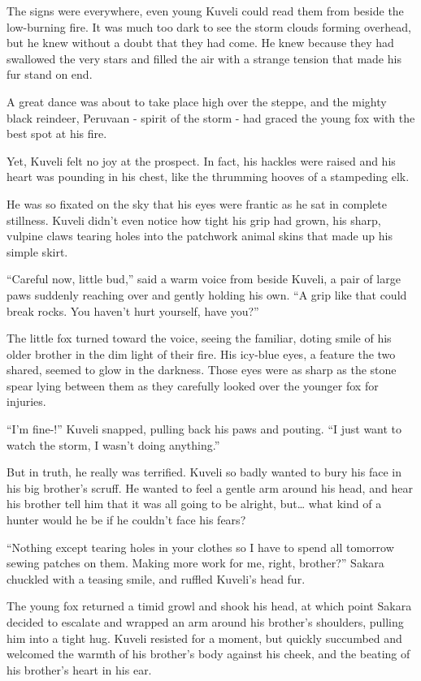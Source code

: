 The signs were everywhere, even young Kuveli could read them from beside the low-burning fire. It was much too dark to see the storm clouds forming overhead, but he knew without a doubt that they had come. He knew because they had swallowed the very stars and filled the air with a strange tension that made his fur stand on end.

A great dance was about to take place high over the steppe, and the mighty black reindeer, Peruvaan - spirit of the storm - had graced the young fox with the best spot at his fire.

Yet, Kuveli felt no joy at the prospect. In fact, his hackles were raised and his heart was pounding in his chest, like the thrumming hooves of a stampeding elk.

He was so fixated on the sky that his eyes were frantic as he sat in complete stillness. Kuveli didn't even notice how tight his grip had grown, his sharp, vulpine claws tearing holes into the patchwork animal skins that made up his simple skirt.

``Careful now, little bud,'' said a warm voice from beside Kuveli, a pair of large paws suddenly reaching over and gently holding his own. ``A grip like that could break rocks. You haven't hurt yourself, have you?''

The little fox turned toward the voice, seeing the familiar, doting smile of his older brother in the dim light of their fire. His icy-blue eyes, a feature the two shared, seemed to glow in the darkness. Those eyes were as sharp as the stone spear lying between them as they carefully looked over the younger fox for injuries.

``I'm fine-!'' Kuveli snapped, pulling back his paws and pouting. ``I just want to watch the storm, I wasn't doing anything.''

But in truth, he really was terrified. Kuveli so badly wanted to bury his face in his big brother's scruff. He wanted to feel a gentle arm around his head, and hear his brother tell him that it was all going to be alright, but\ldots{} what kind of a hunter would he be if he couldn't face his fears?

``Nothing except tearing holes in your clothes so I have to spend all tomorrow sewing patches on them. Making more work for me, right, brother?'' Sakara chuckled with a teasing smile, and ruffled Kuveli's head fur.

The young fox returned a timid growl and shook his head, at which point Sakara decided to escalate and wrapped an arm around his brother's shoulders, pulling him into a tight hug. Kuveli resisted for a moment, but quickly succumbed and welcomed the warmth of his brother's body against his cheek, and the beating of his brother's heart in his ear.

